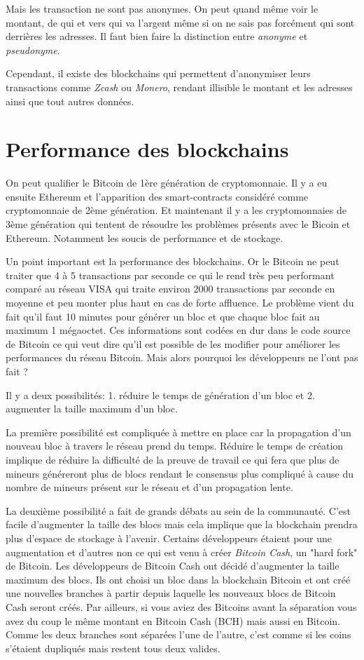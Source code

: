 Mais les transaction ne sont pas anonymes. On peut quand même voir le montant, de qui et vers qui va l'argent même si on ne sais pas forcément qui sont derrières les adresses. Il faut bien faire la distinction entre \emph{anonyme} et \emph{pseudonyme}.

Cependant, il existe des blockchains qui permettent d'anonymiser leurs transactions comme \emph{Zcash} ou \emph{Monero}, rendant illisible le montant et les adresses ainsi que tout autres données.

\section{Performance des blockchains}

On peut qualifier le Bitcoin de 1ère génération de cryptomonnaie. Il y a eu ensuite Ethereum et l'apparition des smart-contracts considéré comme cryptomonnaie de 2ème génération. Et maintenant il y a les cryptomonnaies de 3ème génération qui tentent de résoudre les problèmes présents avec le Bicoin et Ethereum. Notamment les soucis de performance et de stockage.

Un point important est la performance des blockchains. Or le Bitcoin ne peut traiter que 4 à 5 transactions par seconde ce qui le rend très peu performant comparé au réseau VISA qui traite environ 2000 transactions par seconde en moyenne et peu monter plus haut en cas de forte affluence. Le problème vient du fait qu'il faut 10 minutes pour générer un bloc et que chaque bloc fait au maximum 1 mégaoctet. Ces informations sont codées en dur dans le code source de Bitcoin ce qui veut dire qu'il est possible de les modifier pour améliorer les performances du réseau Bitcoin. Mais alors pourquoi les développeurs ne l'ont pas fait ? 

Il y a deux possibilités: 1. réduire le temps de génération d'un bloc et 2. augmenter la taille maximum d'un bloc. 

La première possibilité est compliquée à mettre en place car la propagation d'un nouveau bloc à travers le réseau prend du temps. Réduire le temps de création implique de réduire la difficulté de la preuve de travail ce qui fera que plus de mineurs généreront plus de blocs rendant le consensus plus compliqué à cause du nombre de mineurs présent sur le réseau et d'un propagation lente.

La deuxième possibilité a fait de grands débats au sein de la communauté. C'est facile d'augmenter la taille des blocs mais cela implique que la blockchain prendra plus d'espace de stockage à l'avenir. Certains développeurs étaient pour une augmentation et d'autres non ce qui est venu à créer \emph{Bitcoin Cash}, un "hard fork" de Bitcoin. Les développeurs de Bitcoin Cash ont décidé d'augmenter la taille maximum des blocs. Ils ont choisi un bloc dans la blockchain Bitcoin et ont créé une nouvelles branches à partir depuis laquelle les nouveaux blocs de Bitcoin Cash seront créés. Par ailleurs, si vous aviez des Bitcoins avant la séparation vous avez du coup le même montant en Bitcoin Cash (BCH) mais aussi en Bitcoin. Comme les deux branches sont séparées l'une de l'autre, c'est comme si les coins s'étaient dupliqués mais restent tous deux valides.
